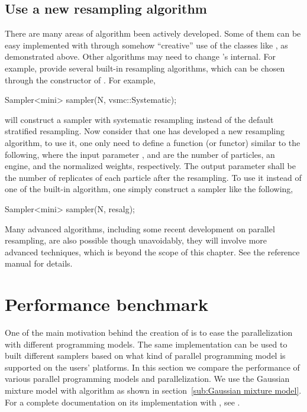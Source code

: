 \subsection{Use a new resampling algorithm}
\label{sub:Use a new resampling algorithm}

There are many areas of \vsmc algorithm been actively developed. Some of them
can be easy implemented with \vsmc through somehow ``creative'' use of the
classes like , as demonstrated above. Other algorithms
may need to change \vsmc's internal. For example, \vsmc provide several
built-in resampling algorithms, which can be chosen through the constructor of
. For example,
\begin{cppcode}
Sampler<mini> sampler(N, vsmc::Systematic);
\end{cppcode}
will construct a sampler with systematic resampling instead of the default
stratified resampling. Now consider that one has developed a new resampling
algorithm, to use it, one only need to define a function (or functor) similar
to the following,
where the input parameter ,  and
 are the number of particles, an \cppoo{} \rng engine, and
the normalized weights, respectively. The output parameter
 shall be the number of replicates of each particle
after the resampling. To use it instead of one of the built-in algorithm, one
simply construct a sampler like the following,
\begin{cppcode}
Sampler<mini> sampler(N, resalg);
\end{cppcode}
Many advanced algorithms, including some recent development on parallel
resampling, are also possible though unavoidably, they will involve more
advanced \cpp techniques, which is beyond the scope of this chapter. See the
reference manual for details.

\section{Performance benchmark}
\label{sec:Performance benchmark}

One of the main motivation behind the creation of \vsmc is to ease the
parallelization with different programming models. The same implementation can
be used to built different samplers based on what kind of parallel programming
model is supported on the users' platforms. In this section we compare the
performance of various \smp parallel programming models and \opencl
parallelization. We use the Gaussian mixture model with \smc[2] algorithm as
shown in section~\ref{sub:Gaussian mixture model}. For a complete
documentation on its implementation with \vsmc, see \cite{software:VSMC}.

